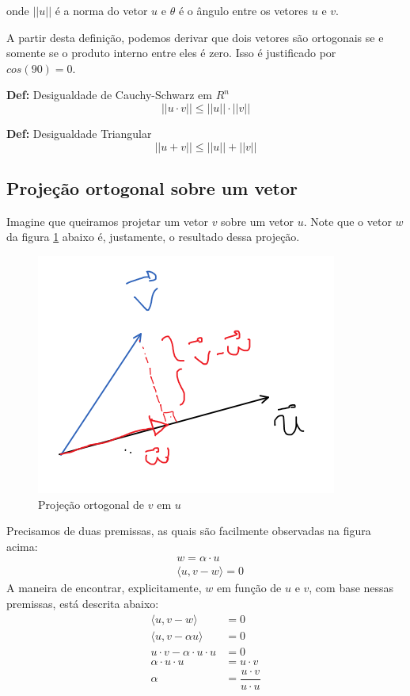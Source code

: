 \documentclass[12pt]{article}
\begin{document}
onde $||u||$ é a norma do vetor $u$ e $\theta$ é o ângulo entre os vetores $u$ e $v$.

A partir desta definição, podemos derivar que dois vetores são ortogonais se e somente se o produto interno entre eles é zero. Isso é justificado por $cos(90)=0$.

\textbf{Def:} Desigualdade de Cauchy-Schwarz em $R^n$
\begin{equation*}
	||u\cdot v|| \leq ||u||\cdot||v||
\end{equation*}

\textbf{Def:} Desigualdade Triangular
\begin{equation*}
	||u+ v|| \leq ||u||+||v||
\end{equation*}

\subsection{Projeção ortogonal sobre um vetor}

Imagine que queiramos projetar um vetor $v$ sobre um vetor $u$. Note que o vetor $w$ da figura \ref{fig:projortog} abaixo é, justamente, o resultado dessa projeção. 
\begin{figure}[H]
	\centering
	\includegraphics[width=0.4\linewidth]{Imagens/projOrtog}
	\caption{Projeção ortogonal de $v$ em $u$}
	\label{fig:projortog}
\end{figure}

Precisamos de duas premissas, as quais são facilmente observadas na figura acima:
\begin{align*}
	&w=\alpha\cdot u\\
	&\langle u,v-w \rangle=0
\end{align*}
A maneira de encontrar, explicitamente, $w$ em função de $u$ e $v$, com base nessas premissas, está descrita abaixo:
\begin{align*}
	\langle u,v-w \rangle&=0\\
	\langle u,v-\alpha u \rangle&=0\\
	u\cdot v - \alpha\cdot u\cdot u&=0\\
	\alpha\cdot u\cdot u&=u\cdot v\\
	\alpha&=\dfrac{u\cdot v}{u\cdot u}
\end{align*}
\end{document}
